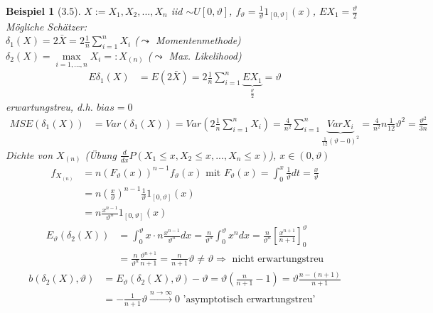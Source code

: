\documentclass[a4paper,openany]{book}
\theoremstyle{mytheoremstyle}
\newtheorem*{bei}{Beispiel}
\theoremstyle{mytheoremstyle2}
\begin{document}
\begin{bei}[3.5]
  $X:=X_1,X_2,...,X_n$ iid $\sim U[0,\vartheta ]$, $f _{\vartheta }=\frac{1}{\vartheta }1_{[0,\vartheta ]}(x)$, $EX_1=\frac{\vartheta }{2}$  \\
  Mögliche Schätzer: \\
  $\delta _1(X)=2 \bar{X}=2 \frac{1}{n}\sum_{i=1}^{n}{X_i}$ ($\leadsto$ Momentenmethode)\\
  $\delta _2(X)=\max\limits _{i=1,...,n}X_i=:X _{(n)}$ ($\leadsto$ Max. Likelihood) 
  \begin{align*}
    E \delta _1(X) &= E(2 \bar{X})=2 \frac{1}{n}\sum_{i=1}^{n}{\underbrace{EX_1}_{\frac{\vartheta }{2}}}=\vartheta 
  \end{align*}
  erwartungstreu, d.h. $bias=0$
  \begin{align*}
    MSE(\delta _1(X)) &= Var (\delta _1(X))=Var\left(2 \frac{1}{n}\sum_{i=1}^{n}{X_i}\right)=\frac{4}{n^2}\sum_{i=1}^{n}{\underbrace{VarX_i}_{\frac{1}{12}(\vartheta -0)^2}}=\frac{4}{n^2}n \frac{1}{12}\vartheta ^2=\frac{\vartheta ^2}{3n}
  \end{align*}
  Dichte von $X _{(n)}$ (Übung $\frac{d}{dx} P(X_1 \leq x,X_2 \leq x,...,X_n \leq x)$), $x \in (0,\vartheta )$
  \begin{align*}
    f _{X _{(n)}}&=n(F _{\vartheta }(x))^{n-1}f _{\vartheta }(x) \text{ mit } F _{\vartheta }(x)=\int_{0}^{x}{\frac{1}{\vartheta }dt}=\frac{x}{\vartheta } \\
                 &=n \left(\frac{x}{\vartheta }\right)^{n-1} \frac{1}{\vartheta }1_{[0,\vartheta ]}(x) \\
                 &=n \frac{x^{n-1}}{\vartheta ^n}1_{[0,\vartheta ]}(x)
  \end{align*}
  \begin{align*}
    E _{\vartheta }(\delta_2(X))&=\int_{0}^{\vartheta }{x \cdot n \frac{x^{n-1}}{\vartheta ^n}dx}
    =\frac{n}{\vartheta ^n}\int_{0}^{\vartheta }{x^{n}dx}=\frac{n}{\vartheta ^n}\left[\frac{x^{n+1}}{n+1}\right]_0^{\vartheta } \\
                                &=\frac{n}{\vartheta ^n}\frac{\vartheta ^{n+1}}{n+1}=\frac{n}{n+1}\vartheta \neq \vartheta \Rightarrow \text{ nicht erwartungstreu}
  \end{align*}
  \begin{align*}
    b(\delta _2(X),\vartheta )&=E _{\vartheta }(\delta _2(X),\vartheta )-\vartheta = \vartheta \left(\frac{n}{n+1}-1\right)=\vartheta \frac{n-(n+1)}{n+1}\\&=-\frac{1}{n+1}\vartheta \overset{n \to \infty }\longrightarrow 0 \text{ 'asymptotisch erwartungstreu'}

\end{align*}
\end{bei}
\end{document}
